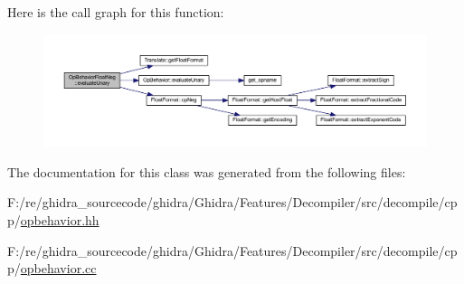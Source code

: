 Here is the call graph for this function\+:
\nopagebreak
\begin{figure}[H]
\begin{center}
\leavevmode
\includegraphics[width=350pt]{class_op_behavior_float_neg_a19a1bd5158a11dafb319316363cb2564_cgraph}
\end{center}
\end{figure}


The documentation for this class was generated from the following files\+:\begin{DoxyCompactItemize}
\item 
F\+:/re/ghidra\+\_\+sourcecode/ghidra/\+Ghidra/\+Features/\+Decompiler/src/decompile/cpp/\mbox{\hyperlink{opbehavior_8hh}{opbehavior.\+hh}}\item 
F\+:/re/ghidra\+\_\+sourcecode/ghidra/\+Ghidra/\+Features/\+Decompiler/src/decompile/cpp/\mbox{\hyperlink{opbehavior_8cc}{opbehavior.\+cc}}\end{DoxyCompactItemize}
